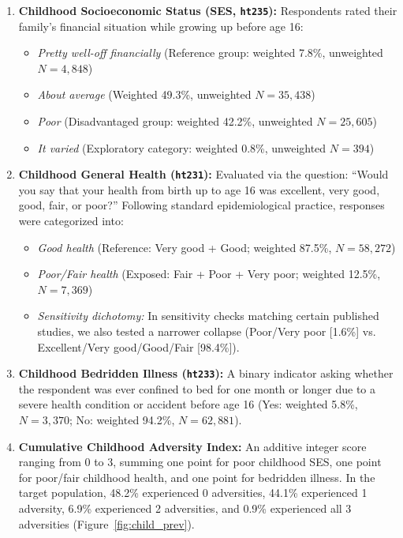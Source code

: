 \begin{enumerate}
    \item \textbf{Childhood Socioeconomic Status (SES, \texttt{ht235}):} Respondents rated their family's financial situation while growing up before age 16:
    \begin{itemize}
        \item \textit{Pretty well-off financially} (Reference group: weighted 7.8\%, unweighted $N = 4,848$)
        \item \textit{About average} (Weighted 49.3\%, unweighted $N = 35,438$)
        \item \textit{Poor} (Disadvantaged group: weighted 42.2\%, unweighted $N = 25,605$)
        \item \textit{It varied} (Exploratory category: weighted 0.8\%, unweighted $N = 394$)
    \end{itemize}
    
    \item \textbf{Childhood General Health (\texttt{ht231}):} Evaluated via the question: ``Would you say that your health from birth up to age 16 was excellent, very good, good, fair, or poor?'' Following standard epidemiological practice, responses were categorized into:
    \begin{itemize}
        \item \textit{Good health} (Reference: Very good + Good; weighted 87.5\%, $N = 58,272$)
        \item \textit{Poor/Fair health} (Exposed: Fair + Poor + Very poor; weighted 12.5\%, $N = 7,369$)
        \item \textit{Sensitivity dichotomy:} In sensitivity checks matching certain published studies, we also tested a narrower collapse (Poor/Very poor [1.6\%] vs. Excellent/Very good/Good/Fair [98.4\%]).
    \end{itemize}

    \item \textbf{Childhood Bedridden Illness (\texttt{ht233}):} A binary indicator asking whether the respondent was ever confined to bed for one month or longer due to a severe health condition or accident before age 16 (Yes: weighted 5.8\%, $N = 3,370$; No: weighted 94.2\%, $N = 62,881$).

    \item \textbf{Cumulative Childhood Adversity Index:} An additive integer score ranging from 0 to 3, summing one point for poor childhood SES, one point for poor/fair childhood health, and one point for bedridden illness. In the target population, 48.2\% experienced 0 adversities, 44.1\% experienced 1 adversity, 6.9\% experienced 2 adversities, and 0.9\% experienced all 3 adversities (Figure~\ref{fig:child_prev}).
\end{enumerate}


